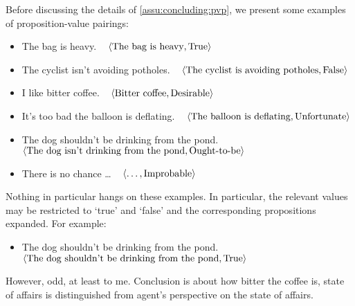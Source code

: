 \begin{note}
  Before discussing the details of \autoref{assu:concluding:pvp}, we present some examples of proposition-value pairings:

  \begin{itemize}
  \item
    The bag is heavy.\newline
    \mbox{ }\hfill%
    \(\langle \text{The bag is heavy}, \text{True} \rangle\)
  \item
    The cyclist isn't avoiding potholes.\newline
    \mbox{ }\hfill%
    \(\langle \text{The cyclist is avoiding potholes}, \text{False} \rangle\)
  \item I like bitter coffee.\newline
    \mbox{ }\hfill%
    \(\langle \text{Bitter coffee}, \text{Desirable} \rangle\)
  \item
    It's too bad the balloon is deflating.\newline
    \mbox{ }\hfill%
    \(\langle \text{The balloon is deflating}, \text{Unfortunate} \rangle\)
  \item
    The dog shouldn't be drinking from the pond.\newline
    \mbox{ }\hfill%
    \(\langle \text{The dog isn't drinking from the pond}, \text{Ought-to-be} \rangle\)
  \item
    There is no chance \dots
    \mbox{ }\hfill%
    \(\langle \text{\dots}, \text{Improbable} \rangle\)
  \end{itemize}

  Nothing in particular hangs on these examples.
  In particular, the relevant values may be restricted to `true' and `false' and the corresponding propositions expanded.
  For example:
  \begin{itemize}
  \item
    The dog shouldn't be drinking from the pond.\newline
    \mbox{ }\hfill%
    \(\langle \text{The dog shouldn't be drinking from the pond}, \text{True} \rangle\)
  \end{itemize}

  However, odd, at least to me.
  Conclusion is about how bitter the coffee is, state of affairs is distinguished from agent's perspective on the state of affairs.
\end{note}

